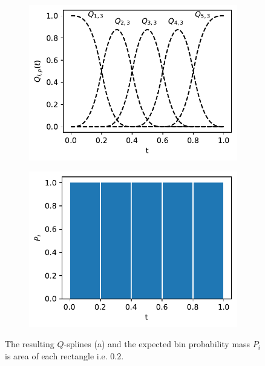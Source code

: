 \documentclass[../Thesis.tex]{subfiles}
\begin{document}
\begin{figure}[H]
    \centering
    \begin{subfigure}[t]{0.49\textwidth}
        \centering
        \includegraphics[width=\linewidth]{figures/MI estimation/Q-spline basis functions - degree 3.pdf}
        \caption{}
        \label{subfig:Q-splines result - splines}
    \end{subfigure}
    \hfill
    \begin{subfigure}[t]{0.49\textwidth}
        \centering
        \includegraphics[width=\linewidth]{figures/MI estimation/Q-spline marginal dist - degree 3.pdf}
        \caption{}
        \label{subfig:Q-splines result - interval probability mass}
    \end{subfigure}
    \caption{The resulting $Q$-splines (a) and the expected bin probability mass $P_i$ is area of each rectangle i.e. $0.2$.}
    \label{fig:Q-splines result}
\end{figure}
\end{document}
